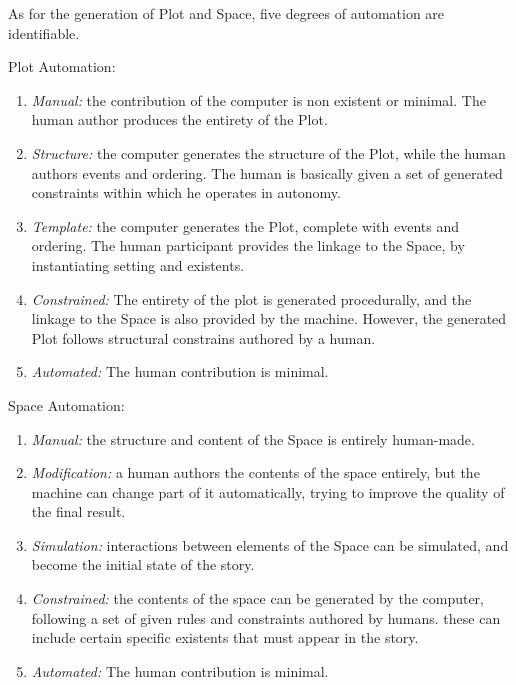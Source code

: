\documentclass[12pt,a4paper,oneside]{report}
\begin{document}
As for the generation of Plot and Space, five degrees of automation are identifiable\cite{kybartasbidarra17}.

\bigskip

Plot Automation:

\begin{enumerate}\setlength{\itemsep}{8pt}
\item \textit{Manual:} the contribution of the computer is non existent or minimal. The human author produces the entirety of the Plot.
\item \textit{Structure:} the computer generates the structure of the Plot, while the human authors events and ordering. The human is basically given a set of generated constraints within which he operates in autonomy.
\item \textit{Template:} the computer generates the Plot, complete with events and ordering. The human participant provides the linkage to the Space, by instantiating setting and existents.
\item \textit{Constrained:} The entirety of the plot is generated procedurally, and the linkage to the Space is also provided by the machine. However, the generated Plot follows structural constrains authored by a human.
\item \textit{Automated:} The human contribution is minimal.
\end{enumerate}

Space Automation:

\begin{enumerate}\setlength{\itemsep}{0pt}
\item \textit{Manual:} the structure and content of the Space is entirely human-made.
\item \textit{Modification:} a human authors the contents of the space entirely, but the machine can change part of it automatically, trying to improve the quality of the final result.
\item \textit{Simulation:} interactions between elements of the Space can be simulated, and become the initial state of the story.
\item \textit{Constrained:} the contents of the space can be generated by the computer, following a set of given rules and constraints authored by humans. these can include certain specific existents that must appear in the story.
\item \textit{Automated:} The human contribution is minimal.
\end{enumerate}

\pagebreak
\end{document}
